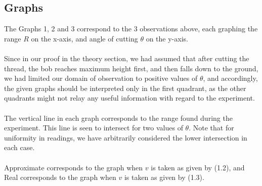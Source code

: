 \subsection{Graphs}
The Graphs 1, 2 and 3 correspond to the 3 observations above, each graphing the range $R$ on the x-axis, and angle of cutting $\theta$ on the y-axis.
\\ \\
Since in our proof in the theory section, we had assumed that after cutting the thread, the bob reaches maximum height first, and then falls down to the ground, we had limited our domain of observation to positive values of $\theta$, and accordingly, the given graphs should be interpreted only in the first quadrant, as the other quadrants might not relay any useful information with regard to the experiment.
\\ \\
The vertical line in each graph corresponds to the range found during the experiment. This line is seen to intersect for two values of $\theta$. Note that for uniformity in readings, we have arbitrarily considered the lower intersection in each case.
\\ \\
Approximate corresponds to the graph when $v$ is taken as given by (1.2), and Real corresponds to the graph when $v$ is taken as given by (1.3).
